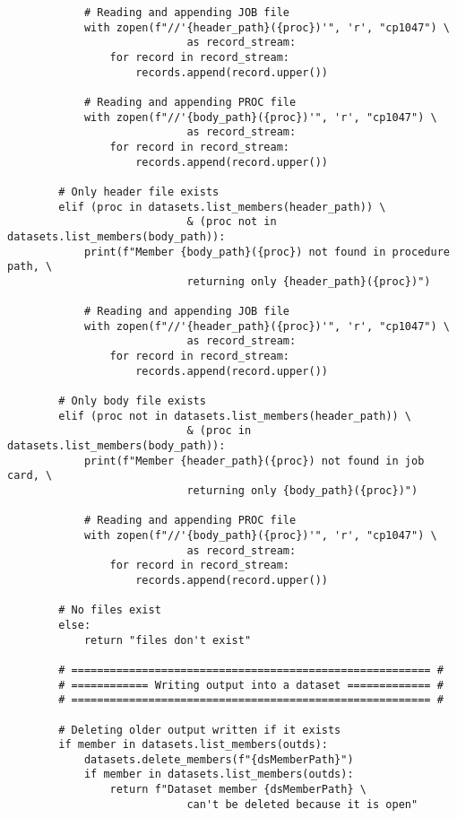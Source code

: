 \begin{lstlisting}
            # Reading and appending JOB file
            with zopen(f"//'{header_path}({proc})'", 'r', "cp1047") \
                            as record_stream:
                for record in record_stream:
                    records.append(record.upper())
        
            # Reading and appending PROC file
            with zopen(f"//'{body_path}({proc})'", 'r', "cp1047") \
                            as record_stream:
                for record in record_stream:
                    records.append(record.upper())
        
        # Only header file exists
        elif (proc in datasets.list_members(header_path)) \
                            & (proc not in datasets.list_members(body_path)):
            print(f"Member {body_path}({proc}) not found in procedure path, \
                            returning only {header_path}({proc})")
            
            # Reading and appending JOB file
            with zopen(f"//'{header_path}({proc})'", 'r', "cp1047") \
                            as record_stream:
                for record in record_stream:
                    records.append(record.upper())
        
        # Only body file exists
        elif (proc not in datasets.list_members(header_path)) \
                            & (proc in datasets.list_members(body_path)):
            print(f"Member {header_path}({proc}) not found in job card, \
                            returning only {body_path}({proc})")
            
            # Reading and appending PROC file
            with zopen(f"//'{body_path}({proc})'", 'r', "cp1047") \
                            as record_stream:
                for record in record_stream:
                    records.append(record.upper())
                    
        # No files exist 
        else:
            return "files don't exist"
        
        # ======================================================== #
        # ============ Writing output into a dataset ============= #
        # ======================================================== #
        
        # Deleting older output written if it exists
        if member in datasets.list_members(outds):
            datasets.delete_members(f"{dsMemberPath}")
            if member in datasets.list_members(outds):
                return f"Dataset member {dsMemberPath} \
                            can't be deleted because it is open"
                

\end{lstlisting}

